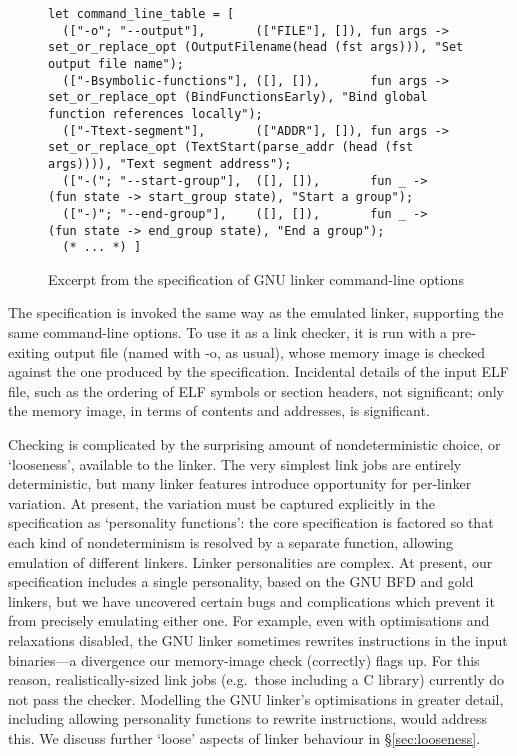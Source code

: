 \documentclass[preprint,10pt]{sigplanconf-pldi16}
\begin{document}
\begin{figure*}[t]
\begin{lstlisting}[language=plain,basicstyle=\scriptsize\sffamily]
let command_line_table = [
  (["-o"; "--output"],       (["FILE"], []), fun args -> set_or_replace_opt (OutputFilename(head (fst args))), "Set output file name");
  (["-Bsymbolic-functions"], ([], []),       fun args -> set_or_replace_opt (BindFunctionsEarly), "Bind global function references locally");
  (["-Ttext-segment"],       (["ADDR"], []), fun args -> set_or_replace_opt (TextStart(parse_addr (head (fst args)))), "Text segment address");
  (["-("; "--start-group"],  ([], []),       fun _ ->   (fun state -> start_group state), "Start a group");
  (["-)"; "--end-group"],    ([], []),       fun _ ->   (fun state -> end_group state), "End a group");
  (* ... *) ]
\end{lstlisting}
\caption{Excerpt from the specification of GNU linker command-line options}
\label{fig:command-line}
\end{figure*}

\label{sec:link-checker}
The specification is invoked the same way as the emulated linker, supporting the same command-line options.
To use it as a link checker, it is run with a pre-exiting output file (named with \textsf{-o}, as usual),
whose memory image is checked against the one produced by the specification.
Incidental details of the input ELF file, such as the ordering of ELF symbols or section headers,
not significant;
only the memory image, in terms of contents and addresses, is significant.

Checking is complicated by the surprising amount of nondeterministic choice, or `looseness', 
available to the linker. 
The very simplest link jobs are entirely deterministic,
but many linker features introduce opportunity for per-linker variation.
At present, the variation must be captured explicitly in the specification as `personality functions':
the core specification is factored so that each kind of nondeterminism is resolved by a separate function, allowing emulation of different linkers.
Linker personalities are complex.
At present, our specification includes a single personality, based on the GNU BFD and \textsf{gold} linkers,
but we have uncovered certain bugs and complications which prevent it from precisely emulating
either one.
For example, even with optimisations and relaxations disabled, the GNU linker sometimes rewrites instructions in the input binaries---a divergence our memory-image check (correctly) flags up.
For this reason, realistically-sized link jobs (e.g.~those including a C library) currently do not pass the checker. 
Modelling the GNU linker's optimisations in greater detail,
including allowing personality functions to rewrite instructions,
would address this.
We discuss further `loose' aspects of linker behaviour in \S\ref{sec:looseness}.
\end{document}
